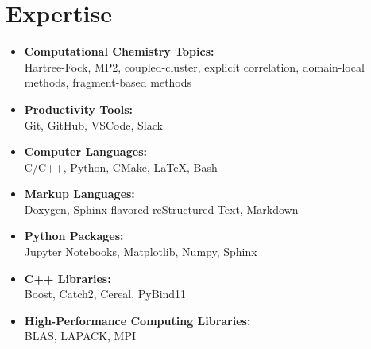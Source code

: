 \documentclass[11pt,a4paper,sans]{moderncv}
\begin{document}
\section{Expertise}
\begin{itemize}
	\item{\textbf{Computational Chemistry Topics:}\\
		  Hartree-Fock, MP2, coupled-cluster, explicit correlation,
		  domain-local methods, fragment-based methods}
	\item{\textbf{Productivity Tools:}\\
		  Git, GitHub, VSCode, Slack}
	\item{\textbf{Computer Languages:}\\
		  C/C++, Python, CMake, \LaTeX, Bash}
	\item{\textbf{Markup Languages:}\\
		  Doxygen, Sphinx-flavored reStructured Text, Markdown}
	\item{\textbf{Python Packages:}\\
		  Jupyter Notebooks, Matplotlib, Numpy, Sphinx}
	\item{\textbf{C++ Libraries:}\\
		  Boost, Catch2, Cereal, PyBind11}
	\item{\textbf{High-Performance Computing Libraries:}\\
		  BLAS, LAPACK, MPI}
\end{itemize}
\end{document}
